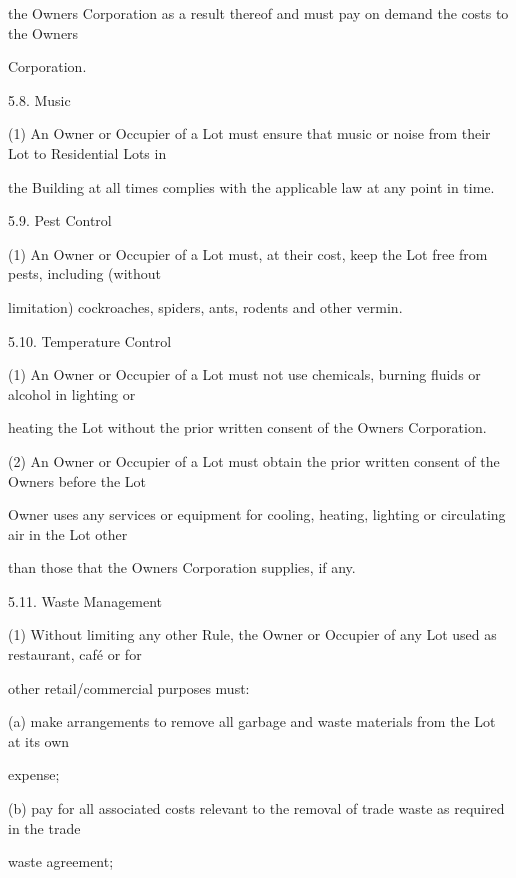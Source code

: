 \documentclass{article}
\begin{document}
{\fontsize{10.02}{1}the Owners Corporation as a result thereof and must pay on demand the costs to the Owners }

{\fontsize{10.02}{1}Corporation. }

{\fontsize{9.99}{1}5.8. Music }

{\fontsize{9.962}{1}(1) An Owner or Occupier of a Lot must ensure that music or noise from their Lot to Residential Lots in }

{\fontsize{10.02}{1}the Building at all times complies with the applicable law at any point in time. }

{\fontsize{9.99}{1}5.9. Pest Control }

{\fontsize{9.962}{1}(1) An Owner or Occupier of a Lot must, at their cost, keep the Lot free from pests, including (without }

{\fontsize{10.02}{1}limitation) cockroaches, spiders, ants, rodents and other vermin. }

{\fontsize{9.99}{1}5.10. Temperature Control }

{\fontsize{9.962}{1}(1) An Owner or Occupier of a Lot must not use chemicals, burning fluids or alcohol in lighting or }

{\fontsize{10.02}{1}heating the Lot without the prior written consent of the Owners Corporation. }

{\fontsize{9.962}{1}(2) An Owner or Occupier of a Lot must obtain the prior written consent of the Owners before the Lot }

{\fontsize{10.02}{1}Owner uses any services or equipment for cooling, heating, lighting or circulating air in the Lot other }

{\fontsize{10.02}{1}than those that the Owners Corporation supplies, if any. }

{\fontsize{9.99}{1}5.11. Waste Management }

{\fontsize{9.962}{1}(1) Without limiting any other Rule, the Owner or Occupier of any Lot used as restaurant, café or for }

{\fontsize{10.02}{1}other retail/commercial purposes must: }

{\fontsize{9.962}{1}(a) make arrangements to remove all garbage and waste materials from the Lot at its own }

{\fontsize{10.02}{1}expense; }

{\fontsize{9.962}{1}(b) pay for all associated costs relevant to the removal of trade waste as required in the trade }

{\fontsize{10.02}{1}waste agreement; }
\end{document}
